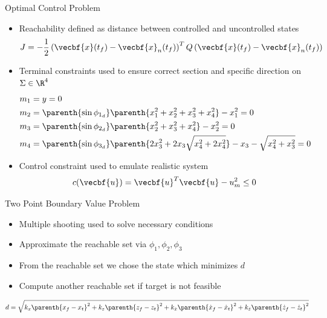 \documentclass[11pt,professionalfonts]{beamer}
\begin{document}
\begin{frame}{Optimal Control Problem}
\begin{itemize}
    \item Reachability defined as distance between controlled and uncontrolled states
    {\small
        \[
            J = -\frac{1}{2} \left( \vecbf{x}(t_f) - \vecbf{x}_{n}(t_f)\right)^T 
            Q
            \left( \vecbf{x}(t_f) - \vecbf{x}_{n}(t_f)\right) 
        \]
    }
    \pause
    \item Terminal constraints used to ensure correct section and specific direction on \( \Sigma \in \R^4 \)
    {\small
        \begin{align*}\label{eq:terminal_constraints}
            \begin{split}
                m_1 &= y = 0  \\
                m_2 &= \parenth{\sin \phi_{1_{d}}} \parenth{ x_1^2 + x_2^2 + x_3^2 + x_4^2} - x_1^2 = 0 \\
                m_3 &= \parenth{\sin \phi_{2_{d}}} \parenth{ x_2^2 + x_3^2 + x_4^2} - x_2^2 = 0\\
                m_4 &= \parenth{\sin \phi_{3_{d}}} \parenth{ 2 x_3^2 + 2 x_3 \sqrt{x_4^2 + 2 x_4^2}} - x_3 - \sqrt{x_4^2 + x_3^2} = 0 
            \end{split}
        \end{align*}
    }
    \pause
    \item Control constraint used to emulate realistic system
        {\small
        \[
            c(\vecbf{u}) = \vecbf{u}^T \vecbf{u} - u_m^2 \leq 0 
        \]
        }
\end{itemize}

\end{frame}

\begin{frame}{Two Point Boundary Value Problem}
\begin{itemize}
    \item Multiple shooting used to solve necessary conditions
    \pause
    \item Approximate the reachable set via \( \phi_1, \phi_2, \phi_3 \) 
    \pause
    \item From the reachable set we chose the state which minimizes \( d \) 
    \item Compute another reachable set if target is not feasible
\end{itemize}

\begin{align*}
    d = \sqrt{k_x \parenth{x_f - x_t }^2 + k_z \parenth{z_f - z_t }^2 + k_{\dot{x}}\parenth{\dot{x}_f - \dot{x}_t }^2 + k_{\dot{z}}\parenth{\dot{z}_f - \dot{z}_t }^2} 
\end{align*}

\end{frame}
\end{document}
